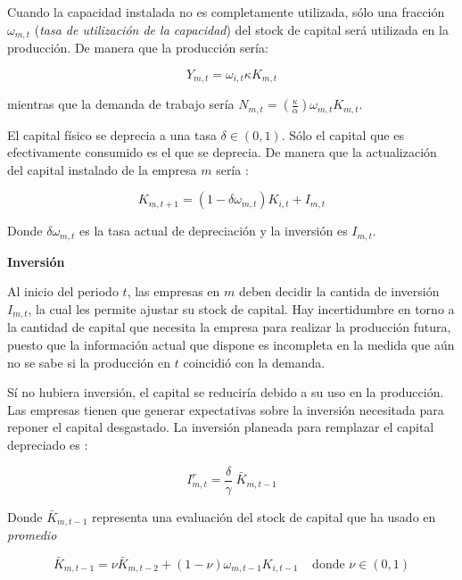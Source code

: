\documentclass[12pt,a4paper]{article}
\begin{document}
Cuando la capacidad instalada no es completamente utilizada, sólo una fracción $\omega_{m,t}$ (\textit{tasa de utilización de la capacidad}) del stock de capital será utilizada en la producción. De manera que la producción sería:

\begin{equation}
Y_{m,t}= \omega_{i,t}\kappa K_{m,t}
\end{equation}

mientras que la demanda de trabajo sería $N_{m,t}= (\frac{\kappa}{\alpha})\omega_{m,t} K_{m,t}$.

El capital físico se deprecia a una tasa $\delta \in (0,1)$. Sólo el capital que es efectivamente consumido es el que se deprecia. De manera que la actualización del capital instalado de la empresa $m$ sería :

\begin{equation}
K_{m,t+1}=(1-\delta \omega_{m,t}) K_{i,t} + I_{m,t}
\end{equation}

Donde $\delta \omega_{m,t}$ es la tasa actual de depreciación y la inversión es $I_{m,t}$.

\vspace{.2cm}
\textbf{Inversión}
\vspace{.2cm}

Al inicio del periodo $t$, las empresas en $m$ deben decidir la cantida de inversión $I_{m,t}$, la cual les permite ajustar su stock de capital. Hay incertidumbre en torno a la cantidad de capital que necesita la empresa para realizar la producción futura, puesto que la información actual que dispone es incompleta en la medida que aún no se sabe si la producción en $t$ coincidió con la demanda. 

Sí no hubiera inversión, el capital se reduciría debido a su uso en la producción. Las empresas tienen que generar expectativas sobre la inversión necesitada para reponer el capital desgastado. La inversión planeada para remplazar el capital depreciado es :

\begin{equation}
I_{m,t}^r= \dfrac{\delta}{\gamma} \; \bar{K}_{m,t-1}
\end{equation}

Donde $\bar{K}_{m,t-1}$ representa una evaluación del stock de capital que ha usado en \textit{promedio}

\[\bar{K}_{m,t-1}= \nu \bar{K}_{m,t-2}+ (1-\nu) \omega_{m,t-1}K_{i,t-1} \; \; \; \; \text{donde $\nu \in (0,1)$}\] 
\end{document}
